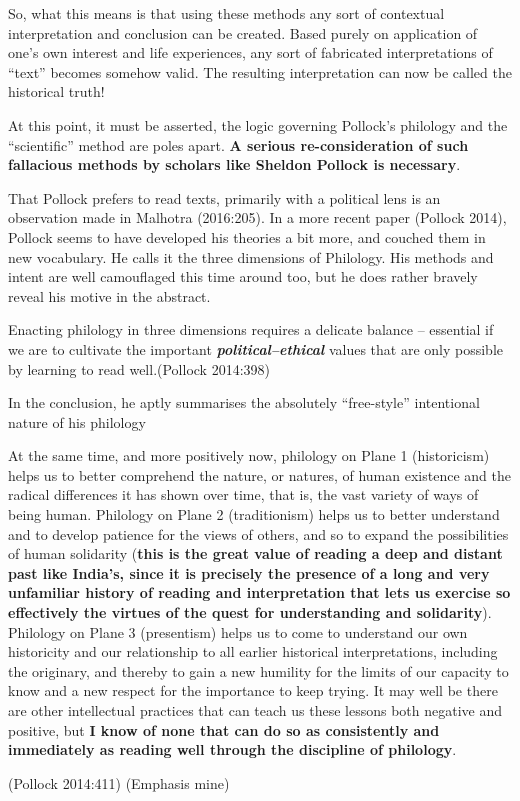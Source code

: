 So, what this means is that using these methods any sort of contextual interpretation and conclusion can be created. Based purely on application of one's own interest and life experiences, any sort of fabricated interpretations of ``text'' becomes somehow valid. The resulting interpretation can now be called the historical truth!

At this point, it must be asserted, the logic governing Pollock's philology and the ``scientific'' method are poles apart. {\bf A serious re-consideration of such fallacious methods by scholars like Sheldon Pollock is necessary}.

That Pollock prefers to read texts, primarily with a political lens is an observation made in Malhotra (2016:205). In a more recent paper (Pollock 2014), Pollock seems to have developed his theories a bit more, and couched them in new vocabulary. He calls it the three dimensions of Philology. His methods and intent are well camouflaged this time around too, but he does rather bravely reveal his motive in the abstract.
\begin{myquote}
Enacting philology in three dimensions requires a delicate balance -- essential if we are to cultivate the important {{\sl\bfseries political--ethical}\relax} values that are only possible by learning to read well.\hfill (Pollock 2014:398)
\end{myquote}

In the conclusion, he aptly summarises the absolutely ``free-style'' intentional nature of his philology
\begin{myquote}
At the same time, and more positively now, philology on Plane 1 (historicism) helps us to better comprehend the nature, or natures, of human existence and the radical differences it has shown over time, that is, the vast variety of ways of being human. Philology on Plane 2 (traditionism) helps us to better understand and to develop patience for the views of others, and so to expand the possibilities of human solidarity ({\bf this is the great value of reading a deep and distant past like India's, since it is precisely the presence of a long and very unfamiliar history of reading and interpretation that lets us exercise so effectively the virtues of the quest for understanding and solidarity}). Philology on Plane 3 (presentism) helps us to come to understand our own historicity and our relationship to all earlier historical interpretations, including the originary, and thereby to gain a new humility for the limits of our capacity to know and a new respect for the importance to keep trying. It may well be there are other intellectual practices that can teach us these lessons both negative and positive, but {\bf I know of none that can do so as consistently and immediately as reading well through the discipline of philology}.

\hfill (Pollock 2014:411) (Emphasis mine)
\end{myquote}

